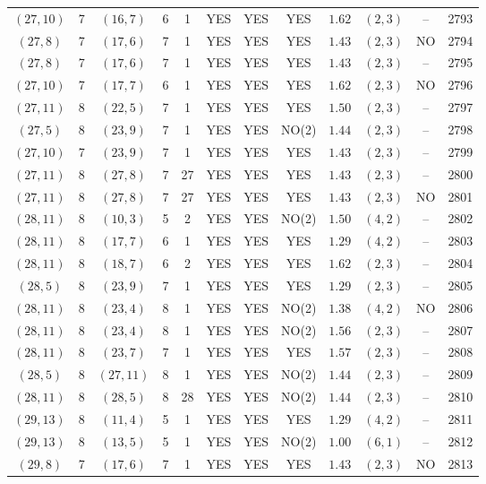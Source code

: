 \begin{longtable}{|c|c|c|c|c|c|c|c|c|c|c|c|}
$(27,10)$ & 7 & $(16,7)$ & 6 & 1 & YES & YES & YES & $1.62$ & $(2,3)$ & -- & 2793\\
$(27,8)$ & 7 & $(17,6)$ & 7 & 1 & YES & YES & YES & $1.43$ & $(2,3)$ & NO & 2794\\
$(27,8)$ & 7 & $(17,6)$ & 7 & 1 & YES & YES & YES & $1.43$ & $(2,3)$ & -- & 2795\\
$(27,10)$ & 7 & $(17,7)$ & 6 & 1 & YES & YES & YES & $1.62$ & $(2,3)$ & NO & 2796\\
$(27,11)$ & 8 & $(22,5)$ & 7 & 1 & YES & YES & YES & $1.50$ & $(2,3)$ & -- & 2797\\
$(27,5)$ & 8 & $(23,9)$ & 7 & 1 & YES & YES & NO(2) & $1.44$ & $(2,3)$ & -- & 2798\\
$(27,10)$ & 7 & $(23,9)$ & 7 & 1 & YES & YES & YES & $1.43$ & $(2,3)$ & -- & 2799\\
$(27,11)$ & 8 & $(27,8)$ & 7 & 27 & YES & YES & YES & $1.43$ & $(2,3)$ & -- & 2800\\
$(27,11)$ & 8 & $(27,8)$ & 7 & 27 & YES & YES & YES & $1.43$ & $(2,3)$ & NO & 2801\\
$(28,11)$ & 8 & $(10,3)$ & 5 & 2 & YES & YES & NO(2) & $1.50$ & $(4,2)$ & -- & 2802\\
$(28,11)$ & 8 & $(17,7)$ & 6 & 1 & YES & YES & YES & $1.29$ & $(4,2)$ & -- & 2803\\
$(28,11)$ & 8 & $(18,7)$ & 6 & 2 & YES & YES & YES & $1.62$ & $(2,3)$ & -- & 2804\\
$(28,5)$ & 8 & $(23,9)$ & 7 & 1 & YES & YES & YES & $1.29$ & $(2,3)$ & -- & 2805\\
$(28,11)$ & 8 & $(23,4)$ & 8 & 1 & YES & YES & NO(2) & $1.38$ & $(4,2)$ & NO & 2806\\
$(28,11)$ & 8 & $(23,4)$ & 8 & 1 & YES & YES & NO(2) & $1.56$ & $(2,3)$ & -- & 2807\\
$(28,11)$ & 8 & $(23,7)$ & 7 & 1 & YES & YES & YES & $1.57$ & $(2,3)$ & -- & 2808\\
$(28,5)$ & 8 & $(27,11)$ & 8 & 1 & YES & YES & NO(2) & $1.44$ & $(2,3)$ & -- & 2809\\
$(28,11)$ & 8 & $(28,5)$ & 8 & 28 & YES & YES & NO(2) & $1.44$ & $(2,3)$ & -- & 2810\\
$(29,13)$ & 8 & $(11,4)$ & 5 & 1 & YES & YES & YES & $1.29$ & $(4,2)$ & -- & 2811\\
$(29,13)$ & 8 & $(13,5)$ & 5 & 1 & YES & YES & NO(2) & $1.00$ & $(6,1)$ & -- & 2812\\
$(29,8)$ & 7 & $(17,6)$ & 7 & 1 & YES & YES & YES & $1.43$ & $(2,3)$ & NO & 2813\\

\end{longtable}
